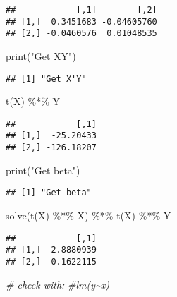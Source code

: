 \documentclass[
]{article}
\newenvironment{Shaded}{\begin{snugshade}}{\end{snugshade}}
\newcommand{\CommentTok}[1]{\textcolor[rgb]{0.56,0.35,0.01}{\textit{#1}}}
\newcommand{\FunctionTok}[1]{\textcolor[rgb]{0.00,0.00,0.00}{#1}}
\newcommand{\NormalTok}[1]{#1}
\newcommand{\SpecialCharTok}[1]{\textcolor[rgb]{0.00,0.00,0.00}{#1}}
\newcommand{\StringTok}[1]{\textcolor[rgb]{0.31,0.60,0.02}{#1}}
\begin{document}
\begin{verbatim}
##            [,1]        [,2]
## [1,]  0.3451683 -0.04605760
## [2,] -0.0460576  0.01048535
\end{verbatim}

\begin{Shaded}
\begin{Highlighting}[]
\FunctionTok{print}\NormalTok{(}\StringTok{"Get X\textquotesingle{}Y"}\NormalTok{)}
\end{Highlighting}
\end{Shaded}

\begin{verbatim}
## [1] "Get X'Y"
\end{verbatim}

\begin{Shaded}
\begin{Highlighting}[]
\FunctionTok{t}\NormalTok{(X) }\SpecialCharTok{\%*\%}\NormalTok{ Y}
\end{Highlighting}
\end{Shaded}

\begin{verbatim}
##            [,1]
## [1,]  -25.20433
## [2,] -126.18207
\end{verbatim}

\begin{Shaded}
\begin{Highlighting}[]
\FunctionTok{print}\NormalTok{(}\StringTok{"Get beta"}\NormalTok{)}
\end{Highlighting}
\end{Shaded}

\begin{verbatim}
## [1] "Get beta"
\end{verbatim}

\begin{Shaded}
\begin{Highlighting}[]
\FunctionTok{solve}\NormalTok{(}\FunctionTok{t}\NormalTok{(X) }\SpecialCharTok{\%*\%}\NormalTok{ X) }\SpecialCharTok{\%*\%} \FunctionTok{t}\NormalTok{(X) }\SpecialCharTok{\%*\%}\NormalTok{ Y}
\end{Highlighting}
\end{Shaded}

\begin{verbatim}
##            [,1]
## [1,] -2.8880939
## [2,] -0.1622115
\end{verbatim}

\begin{Shaded}
\begin{Highlighting}[]
\CommentTok{\# check with:}
\CommentTok{\#lm(y\textasciitilde{}x)}
\end{Highlighting}
\end{Shaded}
\end{document}
